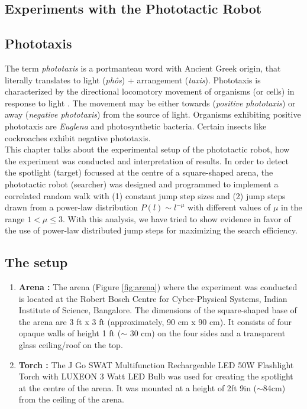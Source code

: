 \documentclass[12pt]{report}
\begin{document}
\begin{justify}
\chapter{Experiments with the Phototactic Robot}
\section{Phototaxis}
The term \textit{phototaxis} is a portmanteau word with Ancient Greek origin, that literally translates to light (\textit{ph\^os}) + arrangement (\textit{taxis}). Phototaxis is characterized by the directional locomotory movement of organisms (or cells) in response to light \cite{phototaxis}. The movement may be either towards (\textit{positive phototaxis}) or away (\textit{negative phototaxis}) from the source of light. Organisms exhibiting positive phototaxis are \textit{Euglena} and photosynthetic bacteria. Certain insects like cockroaches exhibit negative phototaxis.\\


This chapter talks about the experimental setup of the phototactic robot, how the experiment was conducted and interpretation of results. In order to detect the spotlight (target) focussed at the centre of a square-shaped arena, the phototactic robot (searcher) was designed and programmed to implement a correlated random walk with (1) constant jump step sizes and (2) jump steps drawn from a power-law distribution $P(l) \sim l^{-\mu}$ with different values of $\mu$ in the range $1 < \mu \leq 3$. With this analysis, we have tried to show evidence in favor of the use of power-law distributed jump steps for maximizing the search efficiency. 

\section{The setup}
\begin{enumerate}
\item \textbf{Arena :} The arena (Figure \ref{fig:arena}) where the experiment was conducted is located at the Robert Bosch Centre for Cyber-Physical Systems, Indian Institute of Science, Bangalore. The dimensions of the square-shaped base of the arena are 3 ft x 3 ft (approximately, 90 cm x 90 cm). It consists of four opaque walls of height 1 ft ($\sim$ 30 cm) on the four sides  and a transparent glass ceiling/roof on the top.

\item \textbf{Torch :} The J Go SWAT Multifunction Rechargeable LED 50W Flashlight Torch with LUXEON 3 Watt LED Bulb was used for creating the spotlight at the centre of the arena. It was mounted at a height of 2ft 9in ($\sim $84cm) from the ceiling of the arena.


\end{enumerate}
\end{justify}
\end{document}
